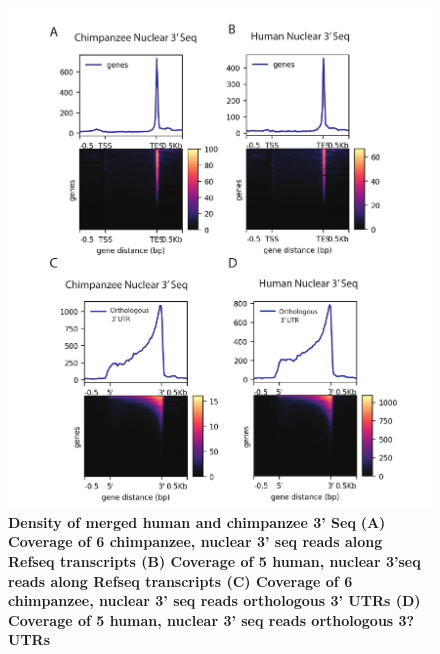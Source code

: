 \begin{figure}[!htb]
\centering
\includegraphics[width=5in]{img/ch03/Fig1-figSup1.pdf}
\caption[Density of merged human and chimpanzee 3' Seq]{\textbf{Density of merged human and chimpanzee 3' Seq} \bf{(A)}  Coverage of 6 chimpanzee, nuclear 3' seq reads along Refseq transcripts {\bf (B)} Coverage of 5 human, nuclear 3'seq reads along Refseq transcripts \bf{(C)} Coverage of 6 chimpanzee, nuclear 3' seq reads orthologous 3' UTRs \bf{(D)} Coverage of 5 human, nuclear 3' seq reads orthologous 3? UTRs}
\label{fig:ch03-deeptools}
\end{figure}
\clearpage


